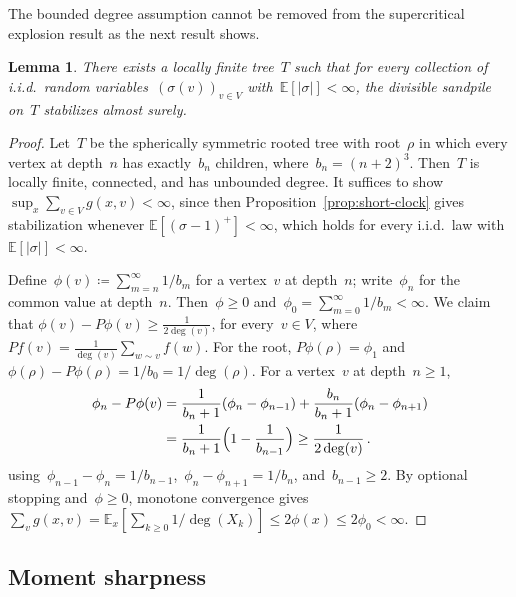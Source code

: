 \documentclass[11pt]{amsart}
\theoremstyle{plain}
\newtheorem{lemma}[theorem]{Lemma}
\theoremstyle{definition}
\newcommand{\E}{\mathbb{E}}
\begin{document}
	The bounded degree assumption cannot be removed from the supercritical explosion result as the next result shows.
	\begin{lemma}\label{ex:counterexample}
		There exists a locally finite tree~$T$ such that for every collection of i.i.d.\ random variables~$(\sigma(v))_{v \in V}$ with~$\E[|\sigma|] < \infty$, the divisible sandpile on~$T$ stabilizes almost surely.
	\end{lemma}
	
	\begin{proof}
		Let~$T$ be the spherically symmetric rooted tree with root~$\rho$ in which every vertex at depth~$n$ has exactly~$b_n$ children, where~$b_n = (n+2)^3$. Then~$T$ is locally finite, connected, and has unbounded degree. It suffices to show $\sup_x\sum_{v\in V}g(x,v)<\infty$, since then Proposition~\ref{prop:short-clock} gives stabilization whenever $\E[(\sigma-1)^+]<\infty$, which holds for every i.i.d.\ law with $\E[|\sigma|]<\infty$.
		
		Define~$\phi(v) \coloneqq \sum_{m=n}^{\infty} 1/b_m$ for a vertex~$v$ at depth~$n$; write~$\phi_n$ for the common value at depth~$n$. Then~$\phi \geq 0$ and~$\phi_0 = \sum_{m=0}^{\infty} 1/b_m < \infty$. We claim that $\phi(v) - P\phi(v) \geq \frac{1}{2\deg(v)}$,
		for every~$v \in V$, where~$Pf(v) = \frac{1}{\deg(v)}\sum_{w \sim v} f(w)$. For the root, $P\phi(\rho)=\phi_1$ and $\phi(\rho)-P\phi(\rho)=1/b_0=1/\deg(\rho)$.
		For a vertex~$v$ at depth~$n \geq 1$,
		\begin{align*}
			\phi_n - P\phi(v) &= \frac{1}{b_n + 1}(\phi_n - \phi_{n-1}) + \frac{b_n}{b_n + 1}(\phi_n - \phi_{n+1}) \\
			&= \frac{1}{b_n + 1}\Bigl(1 - \frac{1}{b_{n-1}}\Bigr) \geq \frac{1}{2\deg(v)}\,.
		\end{align*}
		using~$\phi_{n-1} - \phi_n = 1/b_{n-1}$,~$\phi_n - \phi_{n+1} = 1/b_n$, and~$b_{n-1} \geq 2$. By optional stopping and~$\phi\geq 0$, monotone convergence gives $\sum_v g(x,v)=\E_x[\sum_{k\geq 0}1/\deg(X_k)]\leq 2\phi(x)\leq 2\phi_0<\infty$.
	\end{proof}
	
	
	\subsection{Moment sharpness}
	
\end{document}
